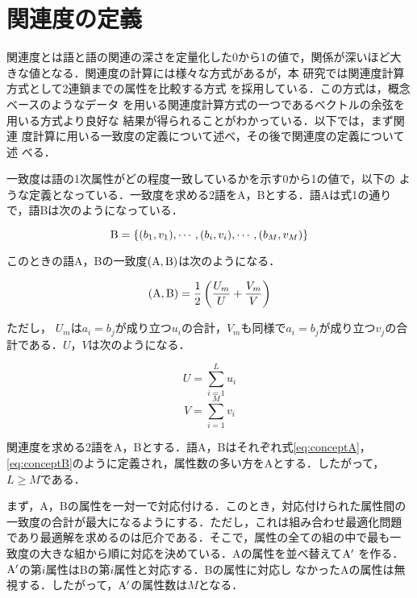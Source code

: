 \section{関連度の定義}

関連度とは語と語の関連の深さを定量化した0から1の値で，関係が深いほど大
きな値となる．関連度の計算には様々な方式があるが\cite{Utsumi2002}，本
研究では関連度計算方式として2連鎖までの属性を比較する方式
\cite{Watabe2001}を採用している．この方式は，概念ベースのようなデータ
を用いる関連度計算方式の一つであるベクトルの余弦を用いる方式より良好な
結果が得られることがわかっている\cite{Watabe2001}．以下では，まず関連
度計算に用いる一致度の定義について述べ，その後で関連度の定義について述
べる．

一致度は語の1次属性がどの程度一致しているかを示す0から1の値で，以下の
ような定義となっている．一致度を求める2語をA，Bとする．語Aは式1の通り
で，語Bは次のようになっている．

\begin{equation}
  {\rm B} = \{(b_1, v_1), \cdots, (b_i, v_i),\cdots , (b_M, v_M)\}
  \label{eq:conceptB}
\end{equation}

このときの語A，Bの一致度$ ({\rm A}, {\rm B})$は次のようになる．

\begin{equation}
   ({\rm A},{\rm B}) = \frac{1}{2}\left( \frac{U_m}{U}+\frac{V_m}{V}\right)
  \label{eq:mach}
\end{equation}

ただし， $U_m$は$a_i = b_j$が成り立つ$u_i$の合計，$V_m$も同様で$a_i =
b_j$が成り立つ$v_j$の合計である．$U$，$V$は次のようになる．

\begin{equation}
  U = \sum_{i=1}^{L}u_i \label{eq:U}
\end{equation}
\begin{equation}
  V = \sum_{i=1}^{M}v_i \label{eq:V}
\end{equation}

関連度を求める2語をA，Bとする．語A，Bはそれぞれ式\ref{eq:conceptA}，
\ref{eq:conceptB}のように定義され，属性数の多い方をAとする．したがって，
$L \ge M$である．

まず，A，Bの属性を一対一で対応付ける．このとき，対応付けられた属性間の
一致度の合計が最大になるようにする．ただし，これは組み合わせ最適化問題
であり最適解を求めるのは厄介である．そこで，属性の全ての組の中で最も一
致度の大きな組から順に対応を決めている．Aの属性を並べ替えて${\rm A}'$
を作る．${\rm A}'$の第$i$属性はBの第$i$属性と対応する．Bの属性に対応し
なかったAの属性は無視する．したがって，${\rm A}'$の属性数は$M$となる．

